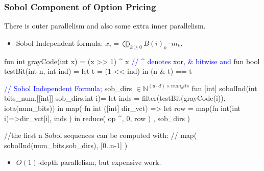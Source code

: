 \documentclass{beamer}
\newcommand{\blue}[1]{\textcolor{Blue}{{#1}}}
\newcommand{\emp}[1]{\textcolor{DikuRed}{ #1}}
\newcommand{\emphh}[1]{\textcolor{CosGreen}{ #1}}
\newcommand{\mymath}[1]{$ #1 $}
\newcommand{\myindu}[1]{^{#1}}
\begin{document}
\begin{frame}[fragile,t]
  \frametitle{Sobol Component of Option Pricing}

There is outer parallelism and also some extra inner parallelism.\bigskip

\begin{itemize}
    \item Sobol Independent formula: $x_i = \bigoplus_{k \geq 0} B(i)_k \cdot m_k$,\bigskip
\end{itemize}

\begin{colorcode}
fun int  grayCode(int x) = (x >> 1) ^ x \blue{// ^ denotes xor, \& bitwise and} 
fun bool testBit(int n, int ind) = let t = (1 << ind) in (n & t) == t 

\blue{// Sobol Independent Formula;} sob_dirs \mymath{\in \mathbb{N}\myindu{(u\cdot{}d)\times{}num_bits}}
fun [int] sobolInd(int bits_num,[[int]] sob_dirs,int i)=
   let inds = \emphh{filter}(testBit(grayCode(i)), iota(num_bits))
   in         \emphh{map}( fn int ([int] dir_vct) => 
                       let row = \emphh{map}(fn int(int i)=>dir_vct[i], inds )
                       in     \emphh{reduce}( op ^, 0, row )
                 , sob_dirs )

//the first n Sobol sequences can be computed with:
//\emphh{map( sobolInd(num_bits,sob_dirs), [0..n-1] )}
\end{colorcode}
\smallskip

\begin{itemize}
    \item \emphh{$O(1)$-depth parallelism}, but \emp{expensive work}. 
\end{itemize}


\end{frame}
\end{document}
